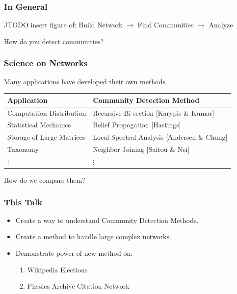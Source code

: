 \documentclass{beamer}
\begin{document}
\begin{frame}\frametitle{In General}

JTODO insert figure of:
Build Network $\rightarrow$ Find Communities $\rightarrow$ Analyze

\begin{block}{}
\begin{center}
How do you detect communities?
\end{center}
\end{block}

\end{frame}

\begin{frame}\frametitle{Science on Networks}

Many applications have developed their own methods.

\begin{table}[!h]
\centering
\begin{tabular}{l|l}
Application & Community Detection Method \\ \hline
Computation Distribution & Recursive Bi-section [Karypis \& Kumar] \\
Statistical Mechanics & Belief Propogation [Hastings]\\
Storage of Large Matrices & Local Spectral Analysis [Andersen \& Chung] \\
Taxonomy & Neighbor Joining [Saitou \& Nei] \\
$\vdots$ & $\vdots$
\end{tabular}
\end{table}

\begin{block}{}
\begin{center}
How do we compare them?
\end{center}
\end{block}

\end{frame}

\begin{frame}\frametitle{This Talk}
\begin{center}
\begin{itemize}
\item Create a way to understand Community Detection Methods.
\item Create a method to handle large complex networks.
\item Demonstrate power of new method on:
	\begin{enumerate}
		\item Wikipedia Elections 
		\item Physics Archive Citation Network
	\end{enumerate}
\end{itemize}
\end{center}

\end{frame}
\end{document}
